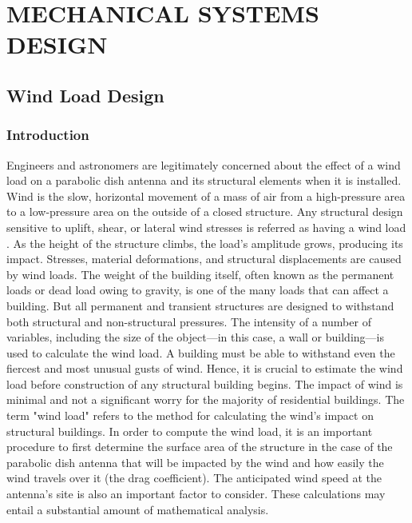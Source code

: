 \chapter{MECHANICAL SYSTEMS  DESIGN}

\label{Chapter3}





\large{
\section{Wind Load Design}
\subsection{Introduction}
Engineers and astronomers are legitimately concerned about the effect of a wind load on a parabolic dish antenna and its structural elements when it is installed. Wind is the slow, horizontal movement of a mass of air from a high-pressure area to a low-pressure area on the outside of a closed structure.
Any structural design sensitive to uplift, shear, or lateral wind stresses is referred as having a wind load . As the height of the structure climbs, the load's amplitude grows, producing its impact. Stresses, material deformations, and structural displacements are caused by wind loads.
The weight of the building itself, often known as the permanent loads or dead load owing to gravity, is one of the many loads that can affect a building. But all permanent and transient structures are designed to withstand both structural and non-structural pressures. The intensity of a number of variables, including the size of the object—in this case, a wall or building—is used to calculate the wind load. A building must be able to withstand even the fiercest and most unusual gusts of wind. Hence, it is crucial to estimate the wind load before construction of any structural building begins.
The impact of wind is minimal and not a significant worry for the majority of residential buildings. The term "wind load" refers to the method for calculating the wind's impact on structural buildings.
In order to compute the wind load, it is an important procedure to first determine the surface area of the structure in the case of the parabolic dish antenna that will be impacted by the wind and how easily the wind travels over it (the drag coefficient).
The anticipated wind speed at the antenna's site is also an important factor to consider. These calculations may entail a substantial amount of mathematical analysis.


}
